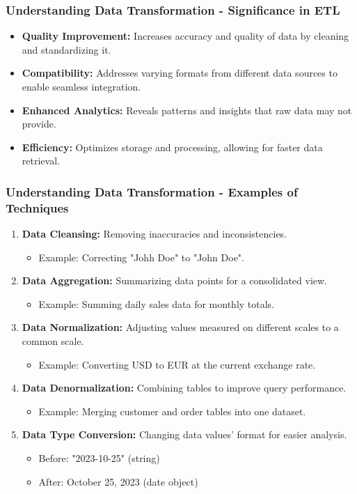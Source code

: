 \documentclass{beamer}
\begin{document}
\begin{frame}[fragile]
    \frametitle{Understanding Data Transformation - Significance in ETL}
    
    \begin{itemize}
        \item \textbf{Quality Improvement:} Increases accuracy and quality of data by cleaning and standardizing it.
        \item \textbf{Compatibility:} Addresses varying formats from different data sources to enable seamless integration.
        \item \textbf{Enhanced Analytics:} Reveals patterns and insights that raw data may not provide.
        \item \textbf{Efficiency:} Optimizes storage and processing, allowing for faster data retrieval.
    \end{itemize}
\end{frame}

\begin{frame}[fragile]
    \frametitle{Understanding Data Transformation - Examples of Techniques}
    
    \begin{enumerate}
        \item \textbf{Data Cleansing:} Removing inaccuracies and inconsistencies.
            \begin{itemize}
                \item Example: Correcting "Johh Doe" to "John Doe".
            \end{itemize}
        \item \textbf{Data Aggregation:} Summarizing data points for a consolidated view.
            \begin{itemize}
                \item Example: Summing daily sales data for monthly totals.
            \end{itemize}
        \item \textbf{Data Normalization:} Adjusting values measured on different scales to a common scale.
            \begin{itemize}
                \item Example: Converting USD to EUR at the current exchange rate.
            \end{itemize}
        \item \textbf{Data Denormalization:} Combining tables to improve query performance.
            \begin{itemize}
                \item Example: Merging customer and order tables into one dataset.
            \end{itemize}
        \item \textbf{Data Type Conversion:} Changing data values' format for easier analysis.
            \begin{itemize}
                \item Before: "2023-10-25" (string)
                \item After: October 25, 2023 (date object)
            \end{itemize}
    \end{enumerate}
\end{frame}
\end{document}
